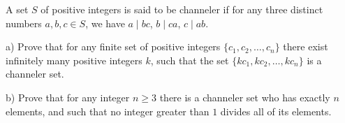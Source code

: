 A set $S$ of positive integers is said to be channeler if for any three distinct numbers $a,b,c \in S$,  we have $a\mid bc$,  $b\mid ca$,  $c\mid ab$.

a) Prove that for any finite set of positive integers $ \{ c_1, c_2, \ldots, c_n \} $ there exist infinitely many positive integers $k$,  such that the set $ \{ kc_1, kc_2, \ldots, kc_n \} $ is a channeler set.

b) Prove that for any integer $n \ge 3$ there is a channeler set who has exactly $n$ elements, and such that no integer greater than $1$ divides all of its elements.